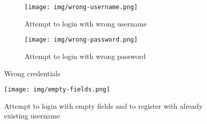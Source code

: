 \documentclass{article}
\begin{document}
\begin{figure}[H]
\centering
\begin{subfigure}[b]{0.45 \textwidth}
    \texttt{[image: img/wrong-username.png]}
    \caption{Attempt to login with wrong username}
    \label{fig:wrong-username}
\end{subfigure}
\hfill
\begin{subfigure}{0.45 \textwidth}
    \texttt{[image: img/wrong-password.png]}
    \caption{Attempt to login with wrong password}
    \label{fig:wrong-password}
\end{subfigure}
\caption{Wrong credentials}
\label{fig:wrong-credentials}
\end{figure}

\begin{figure}[H]
    \centering
    \texttt{[image: img/empty-fields.png]}
    \caption{Attempt to login with empty fields and to register with already existing username}
    \label{fig:empty-fields}
\end{figure}
\end{document}
